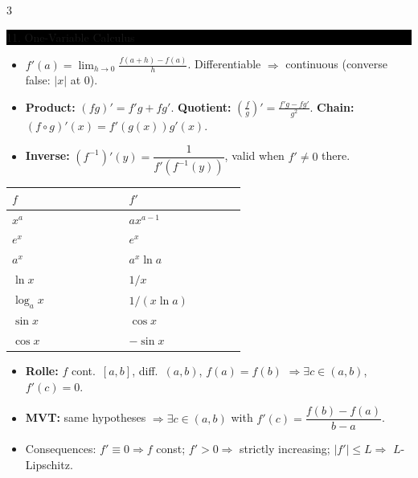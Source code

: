 \documentclass[8pt,letterpaper]{article}
\makeatletter
\newcommand{\sect}[1]{%
  \vspace{2.2pt}%
  \noindent\colorbox{black}{\parbox{\dimexpr\linewidth-2\fboxsep}{%
    \color{white}\bfseries\scshape\fontsize{6.4}{7.4}\selectfont
    \hyphenpenalty=10000\exhyphenpenalty=10000\raggedright #1}}%
  \vspace{1.4pt}\par\nopagebreak\@afterheading}
\newenvironment{tl}
  {\begin{itemize}[leftmargin=6pt,itemsep=0.3pt,topsep=1pt,parsep=0pt,
                   partopsep=0pt,label=\textcolor{gray}{\tiny$\bullet$}]}
  {\end{itemize}}
\makeatother
\begin{document}
\begin{multicols}{3}
\sect{11. One-Variable Calculus}
\begin{tl}
\item $f'(a)=\lim_{h\to0}\frac{f(a+h)-f(a)}{h}$. Differentiable $\Rightarrow$ continuous (converse false: $|x|$ at $0$).
\item \textbf{Product:} $(fg)'=f'g+fg'$. \textbf{Quotient:} $\left(\frac fg\right)'=\frac{f'g-fg'}{g^2}$. \textbf{Chain:} $(f\circ g)'(x)=f'(g(x))g'(x)$.
\item \textbf{Inverse:} $(f^{-1})'(y)=\dfrac{1}{f'(f^{-1}(y))}$, valid when $f'\ne0$ there.
\end{tl}
\begin{center}\fontsize{5.9}{6.9}\selectfont
\begin{tabular}{@{}p{0.30\linewidth}p{0.30\linewidth}@{}}
\hline
$f$ & $f'$\\ \hline
$x^a$ & $ax^{a-1}$\\
$e^x$ & $e^x$\\
$a^x$ & $a^x\ln a$\\
$\ln x$ & $1/x$\\
$\log_a x$ & $1/(x\ln a)$\\
$\sin x$ & $\cos x$\\
$\cos x$ & $-\sin x$\\
\hline
\end{tabular}
\end{center}
\begin{tl}
\item \textbf{Rolle:} $f$ cont.\ $[a,b]$, diff.\ $(a,b)$, $f(a)=f(b)$ $\Rightarrow\exists c\in(a,b)$, $f'(c)=0$.
\item \textbf{MVT:} same hypotheses $\Rightarrow\exists c\in(a,b)$ with $f'(c)=\dfrac{f(b)-f(a)}{b-a}$.
\item Consequences: $f'\equiv0\Rightarrow f$ const; $f'>0\Rightarrow$ strictly increasing; $|f'|\le L\Rightarrow$ $L$-Lipschitz.
\end{tl}


\end{multicols}
\end{document}
